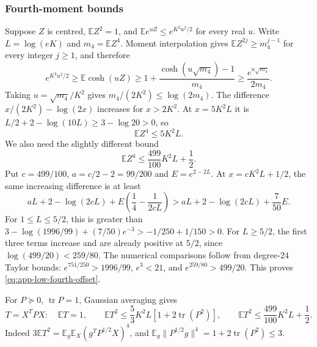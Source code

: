 \documentclass[11pt,a4paper]{article}
\numberwithin{equation}{section}
\begin{document}
\subsubsection{Fourth-moment bounds}
Suppose $Z$ is centred, $\mathbb EZ^2=1$, and
$\mathbb E e^{uZ}\le e^{K^2u^2/2}$ for every real $u$.
Write $L=\log(eK)$ and $m_4=\mathbb EZ^4$. Moment interpolation gives
$\mathbb EZ^{2j}\ge m_4^{j-1}$ for every integer $j\ge1$, and therefore
\[
 e^{K^2u^2/2}\ge\mathbb E\cosh(uZ)
 \ge1+\frac{\cosh(u\sqrt{m_4})-1}{m_4}
 \ge\frac{e^{u\sqrt{m_4}}}{2m_4}.
\]
Taking $u=\sqrt{m_4}/K^2$ gives $m_4/(2K^2)\le\log(2m_4)$.
The difference $x/(2K^2)-\log(2x)$ increases for $x>2K^2$.
At $x=5K^2L$ it is $L/2+2-\log(10L)\ge3-\log20>0$, so
\begin{equation}\label{eq:app-low-fourth}
 \mathbb EZ^4\le5K^2L.
\end{equation}
We also need the slightly different bound
\begin{equation}\label{eq:app-low-fourth-offset}
 \mathbb EZ^4\le\frac{499}{100}K^2L+\frac12.
\end{equation}
Put $c=499/100$, $a=c/2-2=99/200$ and $E=e^{2-2L}$.
At $x=cK^2L+1/2$, the same increasing difference is at least
\[
 aL+2-\log(2cL)+E\left(\frac14-\frac1{2cL}\right)
 >aL+2-\log(2cL)+\frac7{50}E.
\]
For $1\le L\le5/2$, this is greater than
$3-\log(1996/99)+(7/50)e^{-3}>-1/250+1/150>0$.
For $L\ge5/2$, the first three terms increase and are already positive
at $5/2$, since $\log(499/20)<259/80$.
The numerical comparisons follow from degree-$24$ Taylor bounds:
$e^{751/250}>1996/99$, $e^3<21$, and $e^{259/80}>499/20$.
This proves \eqref{eq:app-low-fourth-offset}.

For $P\succeq0$, $\operatorname{tr}P=1$, Gaussian averaging gives
\begin{equation}\label{eq:app-low-Tmoment}
 T=X^TPX:\quad \mathbb ET=1,\qquad
 \mathbb ET^2\le\frac53K^2L[1+2\operatorname{tr}(P^2)],\qquad
 \mathbb ET^2\le\frac{499}{100}K^2L+\frac12.
\end{equation}
Indeed $3\mathbb ET^2=\mathbb E_g\mathbb E_X(g^TP^{1/2}X)^4$,
and $\mathbb E_g\|P^{1/2}g\|^4=1+2\operatorname{tr}(P^2)\le3$.
\end{document}
